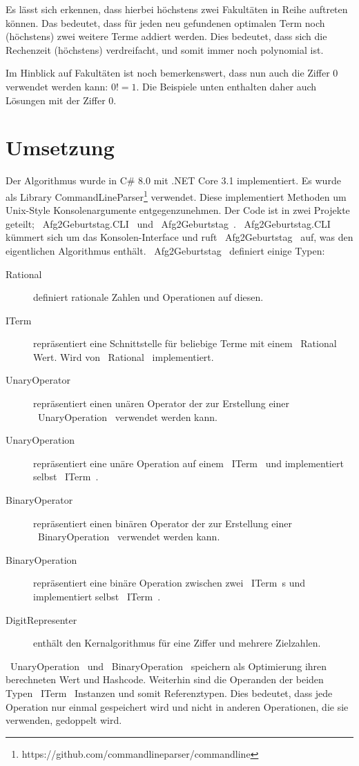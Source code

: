 \documentclass{article}
\theoremstyle{nonumberplain}
\begin{document}
Es lässt sich erkennen, dass hierbei höchstens zwei Fakultäten in Reihe auftreten können.
Das bedeutet, dass für jeden neu gefundenen optimalen Term noch (höchstens) zwei weitere Terme addiert werden.
Dies bedeutet, dass sich die Rechenzeit (höchstens) verdreifacht, und somit immer noch polynomial ist.

Im Hinblick auf Fakultäten ist noch bemerkenswert, dass nun auch die Ziffer \(0\) verwendet werden kann:
\(0! = 1\).
Die Beispiele unten enthalten daher auch Lösungen mit der Ziffer \(0\).

\section{Umsetzung}

Der Algorithmus wurde in C\# 8.0 mit .NET Core 3.1 implementiert.
Es wurde als Library CommandLineParser\footnote{https://github.com/commandlineparser/commandline} verwendet. Diese implementiert Methoden um Unix-Style Konsolenargumente entgegenzunehmen.
Der Code ist in zwei Projekte geteilt;
~Afg2Geburtstag.CLI~ und ~Afg2Geburtstag~.
~Afg2Geburtstag.CLI~ kümmert sich um das Konsolen-Interface und ruft ~Afg2Geburtstag~ auf, was den eigentlichen Algorithmus enthält.
~Afg2Geburtstag~ definiert einige Typen:

\begin{description}
    \item[Rational] definiert rationale Zahlen und Operationen auf diesen.
    \item[ITerm] repräsentiert eine Schnittstelle für beliebige Terme mit einem ~Rational~ Wert. Wird von ~Rational~ implementiert.
    \item[UnaryOperator] repräsentiert einen unären Operator der zur Erstellung einer ~UnaryOperation~ verwendet werden kann.
    \item[UnaryOperation] repräsentiert eine unäre Operation auf einem ~ITerm~ und implementiert selbst ~ITerm~.
    \item[BinaryOperator] repräsentiert einen binären Operator der zur Erstellung einer ~BinaryOperation~ verwendet werden kann.
    \item[BinaryOperation] repräsentiert eine binäre Operation zwischen zwei ~ITerm~s und implementiert selbst ~ITerm~.
    \item[DigitRepresenter] enthält den Kernalgorithmus für eine Ziffer und mehrere Zielzahlen.
\end{description}

~UnaryOperation~ und ~BinaryOperation~ speichern als Optimierung ihren berechneten Wert und Hashcode.
Weiterhin sind die Operanden der beiden Typen ~ITerm~ Instanzen und somit Referenztypen.
Dies bedeutet, dass jede Operation nur einmal gespeichert wird und nicht in anderen Operationen, die sie verwenden, gedoppelt wird.
\end{document}
